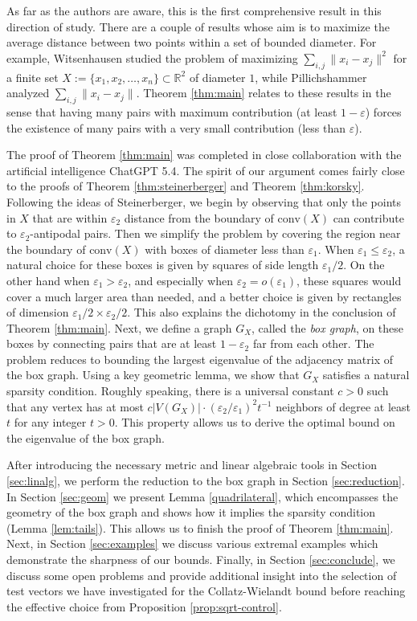 \documentclass[12pt]{article}
\newcommand{\eps}{\varepsilon}
\begin{document}
As far as the authors are aware, this is the first comprehensive result in this direction of study. There are a couple of results whose aim is to maximize the average distance between two points within a set of bounded diameter. For example, Witsenhausen \cite{Witsenhausen1974} studied the problem of maximizing $\sum_{i,j}\|x_i-x_j\|^2$ for a finite set $X:=\{x_1,x_2,\ldots,x_n\}\subset \mathbb{R}^2$ of diameter $1$, while Pillichshammer \cite{Pillichshammer2001, Pillichshammer2000O} analyzed $\sum_{i,j}\|x_i-x_j\|$. Theorem \ref{thm:main} relates to these results in the sense that having many pairs with maximum contribution (at least $1-\eps$) forces the existence of many pairs with a very small contribution (less than $\eps$). 

The proof of Theorem \ref{thm:main} was completed in close collaboration with the artificial intelligence ChatGPT 5.4.  
The spirit of our argument comes fairly close to the proofs of Theorem \ref{thm:steinerberger} and Theorem \ref{thm:korsky}. Following the ideas of Steinerberger, we begin by observing that only the points in $X$ that are within $\eps_2$ distance from the boundary of $\text{conv}(X)$ can contribute to $\eps_2$-antipodal pairs. Then we simplify the problem by covering the region near the boundary of $\text{conv}(X)$ with boxes of diameter less than $\eps_1$. When $\eps_1\leq \eps_2$, a natural choice for these boxes is given by squares of side length $\eps_1/2$. On the other hand when $\eps_1>\eps_2$, and especially when $\eps_2=o(\eps_1)$, these squares would cover a much larger area than needed, and a better choice is given by rectangles of dimension $\eps_1/2\times \eps_2/2$. 
This also explains the dichotomy in the conclusion of Theorem \ref{thm:main}. Next, we define a graph $G_X$, called the \emph{box graph}, on these boxes by connecting pairs that are at least $1-\eps_2$ far from each other. The problem reduces to bounding the largest eigenvalue of the adjacency matrix of the box graph. Using a key geometric lemma, we show that $G_X$ satisfies a natural sparsity condition. Roughly speaking, there is a universal constant $c>0$ such  that any vertex has at most $c|V(G_X)|\cdot (\eps_2/\eps_1)^{2} t^{-1}$ neighbors of degree at least $t$ for any integer $t>0$. This property allows us to derive the optimal bound on the eigenvalue of the box graph.  

After introducing the necessary metric and linear algebraic tools in Section \ref{sec:linalg}, we perform the reduction to the box graph in Section \ref{sec:reduction}. In Section \ref{sec:geom} we present Lemma \ref{quadrilateral}, which encompasses the geometry of the box graph and shows how it implies the sparsity condition (Lemma \ref{lem:tails}). This allows us to finish the proof of Theorem \ref{thm:main}. Next, in Section \ref{sec:examples} we discuss various extremal examples which demonstrate the sharpness of our bounds. Finally, in Section \ref{sec:conclude}, we discuss some open problems and provide additional insight into the selection of test vectors we have investigated for the Collatz-Wielandt bound before reaching the effective choice from Proposition \ref{prop:sqrt-control}.
\end{document}

